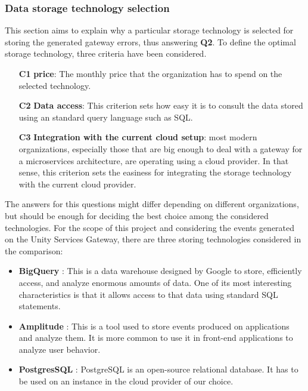\documentclass[english, 12pt, a4paper, sci, utf8, a-1b, online]{aaltothesis}
\begin{document}
\subsubsection{Data storage technology selection}

This section aims to explain why a particular storage technology is selected for storing the generated gateway errors, thus answering \textbf{Q2}. To define the optimal storage technology, three criteria have been considered.

\begin{itemize}
    \item[\textbf{C1}] \textbf{price}: The monthly price that the organization has to spend on the selected technology.
    \item[\textbf{C2}] \textbf{Data access}: This criterion sets how easy it is to consult the data stored using an standard query language such as SQL.
    \item[\textbf{C3}] \textbf{Integration with the current cloud setup}: most modern organizations, especially those that are big enough to deal with a gateway for a microservices architecture, are operating using a cloud provider. In that sense, this criterion sets the easiness for integrating the storage technology with the current cloud provider.
\end{itemize}

The answers for this questions might differ depending on different organizations, but should be enough for deciding the best choice among the considered technologies. For the scope of this project and considering the events generated on the Unity Services Gateway, there are three storing technologies considered in the comparison:

\begin{itemize}
    \item \textbf{BigQuery} \cite{BigQuery}: This is a data warehouse designed by Google to store, efficiently access, and analyze enormous amounts of data. One of its most interesting characteristics is that it allows access to that data using standard SQL statements.
    \item \textbf{Amplitude} \cite{Amplitude}: This is a tool used to store events produced on applications and analyze them. It is more common to use it in front-end applications to analyze user behavior.
    \item \textbf{PostgresSQL} \cite{PostgreSQL}: PostgreSQL is an open-source relational database. It has to be used on an instance in the cloud provider of our choice.
\end{itemize}
\end{document}
